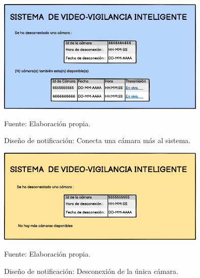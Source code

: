 \begin{figure}[H]
    \begin{center}
        \includegraphics[width=10cm]{img/capitulo_4/cam_connected_more_cams.png}
    \end{center}
    \begin{center}
        \caption{Diseño de notificación: Conecta una cámara más al sistema.}
        Fuente: Elaboración propia.
        \label{fig:desing_cam_conn_more_cams}
    \end{center}
\end{figure}

\begin{figure}[H]
    \begin{center}
        \includegraphics[width=10cm]{img/capitulo_4/cam_connected_no_more_cams.png}
    \end{center}
    \begin{center}
        \caption{Diseño de notificación: Desconexión de la única  cámara.}
        Fuente: Elaboración propia.
        \label{fig:desing_cam_conn_no_more_cams}
    \end{center}
\end{figure}

